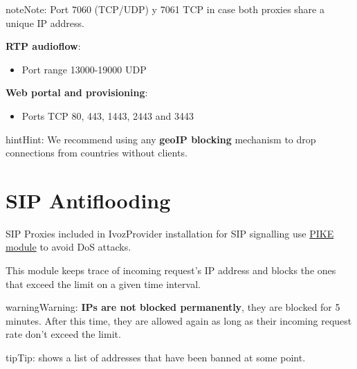 \documentclass[letterpaper,10pt,english]{sphinxmanual}
\begin{document}
\begin{notice}{note}{Note:}
Port 7060 (TCP/UDP) y 7061 TCP in case both proxies share a unique IP address.
\end{notice}

\textbf{RTP audioflow}:
\begin{itemize}
\item {} 
Port range 13000-19000 UDP

\end{itemize}

\textbf{Web portal and provisioning}:
\begin{itemize}
\item {} 
Ports TCP 80, 443, 1443, 2443 and 3443

\end{itemize}

\begin{notice}{hint}{Hint:}
We recommend using any \textbf{geoIP blocking} mechanism to drop connections from
countries without clients.
\end{notice}


\section{SIP Antiflooding}
\label{security_and_maintenance/security/antiflooding::doc}\label{security_and_maintenance/security/antiflooding:sip-antiflooding}\label{security_and_maintenance/security/antiflooding:id1}
SIP Proxies included in IvozProvider installation for SIP signalling use
\href{http://kamailio.org/docs/modules/5.1.x/modules/pike.html}{PIKE module} to avoid DoS attacks.

This module keeps trace of incoming request's IP address and blocks the ones that exceed the limit on a given time
interval.

\begin{notice}{warning}{Warning:}
\textbf{IPs are not blocked permanently}, they are blocked for 5 minutes. After this time, they are allowed again
as long as their incoming request rate don't exceed the limit.
\end{notice}

\begin{notice}{tip}{Tip:}
{\hyperref[administration_portal/platform/antiflood_banned_ips:antiflood\string-banned\string-ips]{}} shows a list of addresses that have been banned at some point.
\end{notice}
\end{document}
